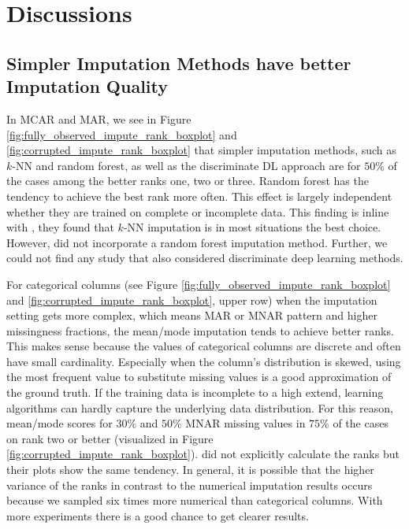 

\section{Discussions}


\subsection{Simpler Imputation Methods have better Imputation Quality}
%
In MCAR and MAR, we see in Figure \ref{fig:fully_observed_impute_rank_boxplot} and \ref{fig:corrupted_impute_rank_boxplot} that simpler imputation methods, such as $k$-NN and random forest, as well as the discriminate DL approach are for $50\%$ of the cases among the better ranks one, two or three. Random forest has the tendency to achieve the best rank more often. This effect is largely independent whether they are trained on complete or incomplete data.
This finding is inline with \cite{Imputation_Benchmark_3, Imputation_Benchmark_2, Imputation_Benchmark_4}, they found that $k$-NN imputation is in most situations the best choice. However, \cite{Imputation_Benchmark_2, Imputation_Benchmark_4} did not incorporate a random forest imputation method. Further, we could not find any study that also considered discriminate deep learning methods.

For categorical columns (see Figure \ref{fig:fully_observed_impute_rank_boxplot} and \ref{fig:corrupted_impute_rank_boxplot}, upper row) when the imputation setting gets more complex, which means MAR or MNAR pattern and higher missingness fractions, the mean/mode imputation tends to achieve better ranks. This makes sense because the values of categorical columns are discrete and often have small cardinality. Especially when the column's distribution is skewed, using the most frequent value to substitute missing values is a good approximation of the ground truth. If the training data is incomplete to a high extend, learning algorithms can hardly capture the underlying data distribution. For this reason, mean/mode scores for $30\%$ and $50\%$ MNAR missing values in $75\%$ of the cases on rank two or better (visualized in Figure \ref{fig:corrupted_impute_rank_boxplot}). \cite{Imputation_Benchmark_3} did not explicitly calculate the ranks but their plots show the same tendency. In general, it is possible that the higher variance of the ranks in contrast to the numerical imputation results occurs because we sampled six times more numerical than categorical columns. With more experiments there is a good chance to get clearer results.

